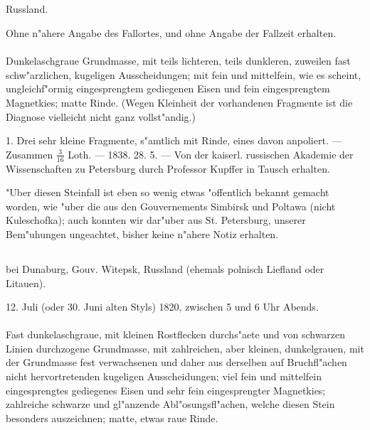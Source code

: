\documentclass[a4paper, 11pt, oneside, polutonikogreek, german]{article}
\begin{document}
\subsection{}
\begin{center}

Russland.

Ohne n"ahere Angabe des Fallortes, und ohne Angabe der Fallzeit erhalten.
\end{center}
\paragraph{}
Dunkelaschgraue Grundmasse, mit teils lichteren, teils dunkleren, zuweilen fast schw"arzlichen, kugeligen Ausscheidungen; mit fein und mittelfein, wie es scheint, ungleichf"ormig eingesprengtem gediegenen Eisen und fein eingesprengtem Magnetkies; matte Rinde. (Wegen Kleinheit der vorhandenen Fragmente ist die Diagnose vielleicht nicht ganz vollst"andig.)

1. Drei sehr kleine Fragmente, s"amtlich mit Rinde, eines davon anpoliert. --- Zusammen $\frac{3}{16}$ Loth. --- 1838. 28. 5. --- Von der kaiserl. russischen Akademie der Wissenschaften zu Petersburg durch Professor Kupffer in Tausch erhalten.

\setlength{\leftskip}{10mm}
\setlength{\parindent}{0pt}

{\footnotesize "Uber diesen Steinfall ist eben so wenig etwas "offentlich bekannt gemacht worden, wie "uber die aus den Gouvernements Simbirsk und Poltawa (nicht Kuleschofka); auch konnten wir dar"uber aus St. Petersburg, unserer Bem"uhungen ungeachtet, bisher keine n"ahere Notiz erhalten.}

\setlength{\leftskip}{0pt}
\setlength{\parindent}{20pt}

\subsection[\frakfamily{Lixna.}]{}
\begin{center}

bei Dunaburg, Gouv. Witepsk, Russland (ehemals polnisch Liefland oder Litauen).

12. Juli (oder 30. Juni alten Styls) 1820, zwischen 5 und 6 Uhr Abends.
\end{center}
\paragraph{}
Fast dunkelaschgraue, mit kleinen Rostflecken durchs"aete und von schwarzen Linien durchzogene Grundmasse, mit zahlreichen, aber kleinen, dunkelgrauen, mit der Grundmasse fest verwachsenen und daher aus derselben auf Bruchfl"achen nicht hervortretenden kugeligen Ausscheidungen; viel fein und mittelfein eingesprengtes gediegenes Eisen und sehr fein eingesprengter Magnetkies; zahlreiche schwarze und gl"anzende Abl"osungsfl"achen, welche diesen Stein besonders auszeichnen; matte, etwas raue Rinde.
\end{document}
